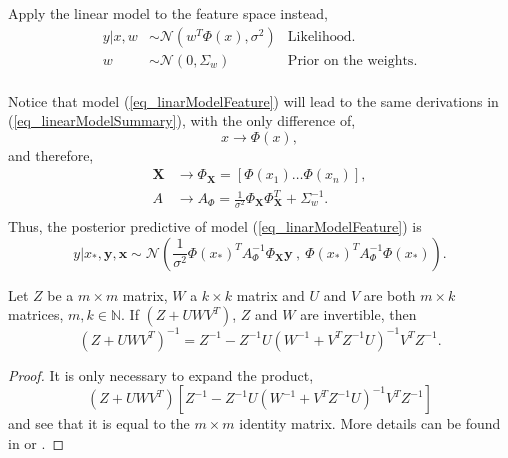 Apply the linear model to the feature space instead,
\begin{equation} \label{eq_linarModelFeature}
  \begin{array}{rll}
    y | x,w & \sim \mathcal{N}(w^T \Phi(x), \sigma^2) & \text{Likelihood.} \\
    w       & \sim \mathcal{N}(0,\Sigma_w)      & \text{Prior on the weights.} \\
  \end{array}
\end{equation}

Notice that model (\ref{eq_linarModelFeature}) will lead to the same derivations in (\ref{eq_linearModelSummary}), with the only difference of,
\begin{equation*}
  x \rightarrow \Phi(x),
\end{equation*}
and therefore,
\begin{equation} \label{eq_matrixAPHI}
  \begin{aligned}
    \pmb{X} &\rightarrow \Phi_{\pmb{X}} = [\Phi(x_1) \hdots \Phi(x_n)], \\
    A &\rightarrow
       A_{\Phi} = \frac{1}{\sigma^2}\Phi_{\pmb{X}}\Phi_{\pmb{X}}^T + \Sigma_w^{-1}. \\ 
  \end{aligned}   
\end{equation}
Thus, the posterior predictive of model (\ref{eq_linarModelFeature}) is
\begin{equation} \label{eq_posteriorPredictiveLinearModelFeature}
    y | x_*, \pmb{y}, \pmb{x}
      \sim \mathcal{N} \left( 
                      \frac{1}{\sigma^2}\Phi(x_*)^TA_{\Phi}^{-1}\Phi_{\pmb{X}}\pmb{y} \  ,  \
                      \Phi(x_*)^T A_{\Phi}^{-1} \Phi(x_*)
                     \right).
\end{equation}

\begin{lemma} \label{lemma_inversionMatrix}
  Let $Z$ be a $m \times m$ matrix, $W$ a $k \times k$ matrix and $U$ and $V$ are both $m \times k$ matrices, $m,k \in \mathbb{N}$. If $(Z+UWV^T)$, $Z$ and $W$ are invertible, then
  \begin{equation*}
    (Z+UWV^T)^{-1} = Z^{-1} - Z^{-1}U(W^{-1} + V^T Z^{-1} U)^{-1}V^TZ^{-1}.
  \end{equation*}
  \begin{proof}
    It is only necessary to expand the product,
    \begin{equation*}
      (Z+UWV^T)[Z^{-1} - Z^{-1}U(W^{-1} + V^T Z^{-1} U)^{-1}V^TZ^{-1}]
    \end{equation*} 
    and see that it is equal to the $m \times m$ identity matrix. More details can be found in \textcite{woodbury1950} or \textcite{press1992}.
  \end{proof}
\end{lemma}

